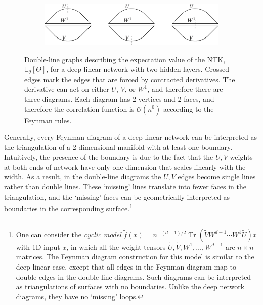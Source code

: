 \documentclass[english]{article}
\newcommand{\cO}{\ensuremath{\mathcal{O}}}
\DeclareMathOperator{\trace}{Tr}
\newcommand{\lexpp}[1]{\mathbb{E}_{#1}\left[}
\newcommand{\rexp}{\right]}
\begin{document}
\begin{figure}[ht!]
  \centering
  \begin{subfigure}[b]{0.6\textwidth}
    \includegraphics[width=\textwidth]{new_figs/ntk_2hl.pdf}
  \end{subfigure}
  \caption{Double-line graphs describing the expectation value of the NTK, $\lexpp{\theta} \Theta \rexp$, for a deep linear network with two hidden layers.
    Crossed edges mark the edges that are forced by contracted derivatives.
    The derivative can act on either $U$, $V$, or $W^1$, and therefore there are three diagrams.
    Each diagram has 2 vertices and 2 faces, and therefore the correlation function is $\cO(n^0)$ according to the Feynman rules.}\label{fig:ntk_sqr_2hl}
\end{figure}

Generally, every Feynman diagram of a deep linear network can be interpreted as the triangulation of a 2-dimensional manifold with at least one boundary.
Intuitively, the presence of the boundary is due to the fact that the $U,V$ weights at both ends of network have only one dimension that scales linearly with the width.
As a result, in the double-line diagrams the $U,V$ edges become single lines rather than double lines.
These `missing' lines translate into fewer faces in the triangulation, and the `missing' faces can be geometrically interpreted as boundaries in the corresponding surface.\footnote{
  One can consider the \emph{cyclic model} 
  $\tilde{f}(x) = n^{-(d+1)/2} \trace \left( \tilde{V} W^{d-1} \cdots W^1 \tilde{U} \right) x$ with 1D input $x$, in which all the weight tensors $\tilde{U},\tilde{V},W^1,\dots,W^{d-1}$ are $n\times n$ matrices.
  The Feynman diagram construction for this model is similar to the deep linear case, except that all edges in the Feynman diagram map to double edges in the double-line diagrams.
  Such diagrams can be interpreted as triangulations of surfaces with no boundaries.
  Unlike the deep network diagrams, they have no `missing' loops.
  }
\end{document}
